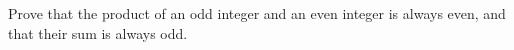 Prove that the product of an odd integer and an even integer is always even, and that their sum is always odd.
